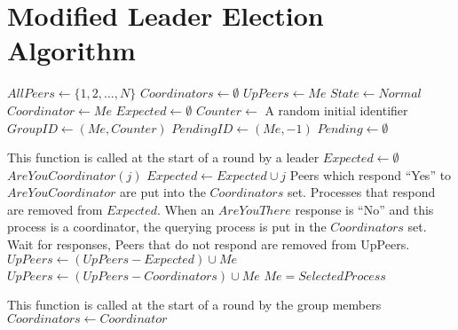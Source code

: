 \section{Modified Leader Election Algorithm}
\label{apdx:algorithm}

\begin{flushleft}
\begin{algorithmic}[H]

\State $AllPeers \gets \{ 1, 2, ..., N \}$
\State $Coordinators \gets \emptyset$
\State $UpPeers \gets { Me }$
\State $State \gets Normal$
\State $Coordinator \gets Me$
\State $Expected \gets \emptyset$
\State $Counter \gets$ A random initial identifier
\State $GroupID \gets (Me,Counter)$
\State $PendingID \gets (Me, -1)$
\State $Pending \gets \emptyset$

\State

    \State This function is called at the start of a round by a leader
        \State $Expected \gets \emptyset$
            \State $AreYouCoordinator(j)$
            \State $Expected \gets Expected \cup j$
        \EndFor
        \State Peers which respond ``Yes'' to $AreYouCoordinator$ are put into the $Coordinators$ set.
		\State Processes that respond are removed from $Expected$.
        \State When an $AreYouThere$ response is ``No'' and this process is a coordinator, the querying process is put in the $Coordinators$ set.
        \State Wait for responses, Peers that do not respond are removed from UpPeers.
        \State $UpPeers \gets (UpPeers-Expected) \cup {Me}$
		\State $UpPeers \gets (UpPeers-Coordinators) \cup {Me}$
            \Return
        \EndIf
        \If $Me = SelectedProcess$
        \EndIf
    \EndIf
\EndFunction

\State

    \State This function is called at the start of a round by the group members
        \Return
    \Else
			\State $Coordinators \gets Coordinator$
        \EndIf
    \EndIf
\EndFunction

\State


\end{algorithmic}
\end{flushleft}
